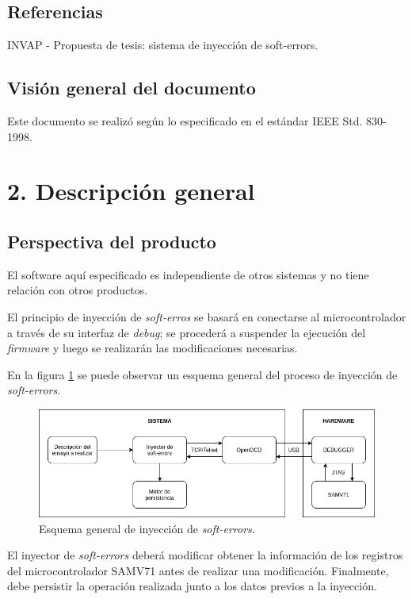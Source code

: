 \documentclass[
11pt, %
codirector, %
]{charter}
\begin{document}
\subsection{Referencias}
\label{sub:referencias}
INVAP - Propuesta de tesis: sistema de inyección de soft-errors.

\subsection{Visión general del documento}
\label{sub:vision}

Este documento se realizó según lo especificado en el estándar IEEE Std. 830-1998.

\newpage
\section{2. Descripción general}
\label{seb:descripcion}

\subsection{Perspectiva del producto}
\label{sub:perspectiva}

El software aquí especificado es independiente de otros sistemas y no tiene relación con otros productos.

El principio de inyección de \emph{soft-erros} se basará en conectarse al microcontrolador a través de su interfaz de \emph{debug}; se procederá a suspender la ejecución del \emph{firmware} y luego se realizarán las modificaciones necesarias.

En la figura \ref{fig:esqInyeccion} se puede observar un esquema general del proceso de inyección de \emph{soft-errors}.

\begin{figure}[h]
	\centering
	\includegraphics[width=\textwidth]{./Figuras/inyeccion.png}
	\caption{Esquema general de inyección de \emph{soft-errors}.}
	\label{fig:esqInyeccion}
\end{figure}

El inyector de \emph{soft-errors} deberá modificar obtener la información de los registros del microcontrolador SAMV71 antes de realizar una modificación.
Finalmente, debe persistir la operación realizada junto a los datos previos a la inyección.
\end{document}
